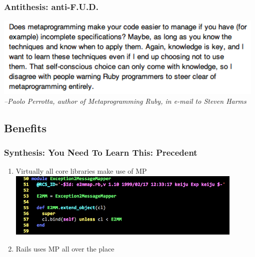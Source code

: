 \documentclass[slidestop,compress,mathserif]{beamer}
\begin{document}
\begin{frame}
	\frametitle{Antithesis:  anti-F.U.D.}
	\includegraphics[width=0.98\textwidth, height=0.45\textheight]{img/paolo_anti_fud.png}		
	\vskip 0.5cm
	\emph{--Paolo Perrotta, author of Metaprogramming Ruby, in e-mail to Steven Harms}
\end{frame}

\subsection{Benefits} %
\label{sub:benefits}

\begin{frame}
	\frametitle{Synthesis:  You Need To Learn This:  Precedent}
	\begin{enumerate}
		\item Virtually all core libraries make use of MP
		\pause
		\includegraphics[scale=0.45, width=0.89\textwidth]{img/e2mmap.png}
		\pause
		\item Rails uses MP all over the place
	\end{enumerate}
\end{frame}
\end{document}
